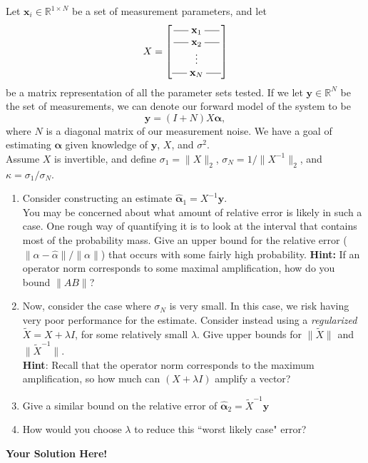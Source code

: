 \documentclass[12pt]{article}
\newcommand{\x}{\mathbf{x}}
\newcommand{\y}{\mathbf{y}}
\newcommand{\0}{\mathbf{0}}
\newcommand{\1}{\mathbf{1}}
\newcommand{\hdash}{\rule[.5ex]{1.5em}{0.4pt}}
\newcommand{\solspace}{\vspace{3mm} \textbf{Your Solution Here!} \vspace{3mm}}
\begin{document}
Let $\x_i \in \mathbb{R}^{1 \times N}$ be a set of measurement parameters, and let 
$$
X = \begin{bmatrix}
    \hdash \; \x_1 \; \hdash \\
    \hdash \; \x_2 \; \hdash\\
    \vdots \\
    \hdash \; \x_N \; \hdash
\end{bmatrix}
$$
be a matrix representation of all the parameter sets tested.
If we let $\y \in \mathbb{R}^N$ be the set of measurements, we can denote our forward model of the system to be
$$
\y = (I + N)X\bm{\alpha},
$$
where $N$ is a diagonal matrix of our measurement noise.
We have a goal of estimating $\bm\alpha$ given knowledge of $\y$, $X$, and $\sigma^2$.\\
Assume $X$ is invertible, and define $\sigma_1 = \|X\|_2$, $\sigma_N = 1/\|X^{-1}\|_2$, and $\kappa = \sigma_1/\sigma_N$.
\begin{enumerate}
    \item Consider constructing an estimate $\hat{\bm{\alpha}}_1 = X^{-1}\y$. \\
    You may be concerned about what amount of relative error is likely in such a case.
    One rough way of quantifying it is to look at the interval that contains most of the probability mass.
    Give an upper bound for the relative error ($\|\alpha - \hat \alpha\|/\|\alpha\|$) that occurs with some fairly high probability.
    \textbf{Hint:} If an operator norm corresponds to some maximal amplification, how do you bound $\|A B\|$?
    \item Now, consider the case where $\sigma_N$ is very small.
        In this case, we risk having very poor performance for the estimate.
        Consider instead using a \textit{regularized} $\tilde X = X + \lambda I$, for some relatively small $\lambda$.
        Give upper bounds for $\| \tilde X \|$ and $\| \tilde X^{-1}\|$. \\
        \textbf{Hint}: Recall that the operator norm corresponds to the maximum amplification, so how much can $(X + \lambda I)$ amplify a vector?
    \item Give a similar bound on the relative error of $\hat{\bm{\alpha}}_2 = \tilde X^{-1}\y$
    \item How would you choose $\lambda$ to reduce this ``worst likely case" error?
\end{enumerate}

\solspace

\pagebreak
\end{document}
